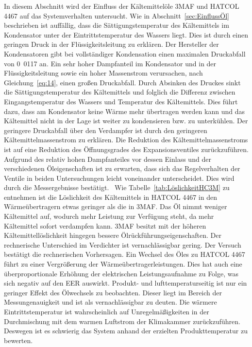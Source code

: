 In diesem Abschnitt wird der Einfluss der Kältemittelöle 3MAF und HATCOL 4467 auf das Systemverhalten untersucht.
Wie in Abschnitt~\ref{sec:EinflussÖl} beschrieben ist auffällig, dass die Sättigungstemperatur des Kältemittels im Kondensator unter der Eintrittstemperatur des Wassers liegt. Dies ist durch einen geringen Druck in der Flüssigkeitsleitung zu erklären. Der Hersteller der Kondensatoren gibt bei vollständiger Kondensation einen maximalen Druckabfall von \unit{0.0117}{\bbar} an. Ein sehr hoher Dampfanteil im Kondensator und in der Flüssigkeitsleitung sowie ein hoher Massenstrom verursachen, nach Gleichung~\ref{eq:14}, einen großen Druckabfall. Durch Absinken des Druckes sinkt die Sättigungstemperatur des Kältemittels und folglich die Differenz zwischen Eingangstemperatur des Wassers und Temperatur des Kältemittels. Dies führt dazu, dass am Kondensator keine Wärme mehr übertragen werden kann und das Kältemittel nicht in der Lage ist weiter zu kondensieren bzw. zu unterkühlen. Der geringere Druckabfall über den Verdampfer ist durch den geringeren Kältemittelmassenstrom zu erklären. Die Reduktion des Kältemittelmassenstroms ist auf eine Reduktion des Öffnungsgrades des Expansionsventiles zurückzuführen. Aufgrund des relativ hohen Dampfanteiles vor dessen Einlass und der verschiedenen Öleigenschaften ist zu erwarten, dass sich das Regelverhalten der Ventile in beiden Untersuchungen leicht voneinander unterscheidet. Dies wird durch die Messergebnisse bestätigt. \
Wie Tabelle~\ref{tab:LöslichkeitHC3M} zu entnehmen ist die Löslichkeit des Kältemittels in HATCOL 4467 in den Wärmeübertragern etwas geringer als die in 3MAF. Das Öl nimmt weniger Kältemittel auf, wodurch mehr Leistung zur Verfügung steht, da mehr Kältemittel sofort verdampfen kann. 3MAF besitzt mit der höheren Kältemittellöslichkeit hingegen bessere Ölrückführungseigenschaften. Der rechnerische Unterschied im Verdichter ist vernachlässigbar gering.
Der Versuch bestätigt die rechnerischen Vorhersagen. Ein Wechsel des Öles zu HATCOL 4467 führt zu einer Vergrößerung der Wärmeübertragerleistungen. Dies hat auch eine überproportionale Erhöhung der elektrischen Leistungsaufnahme zu Folge, was sich negativ auf den EER auswirkt.
Produkt- und lufttemperaturseitig ist nur ein geringer Effekt des Ölwechsels zu beobachten. Dieser liegt im Bereich der Messungenauigkeit und ist als vernachlässigbar zu deuten. Die wärmere Eintrittstemperatur ist wahrscheinlich auf Unregelmäßigkeiten in der Durchmischung mit dem warmen Luftstrom der Klimakammer zurückzuführen. Deswegen ist es schwierig das System anhand der erzielten Produkttemperatur zu bewerten.

